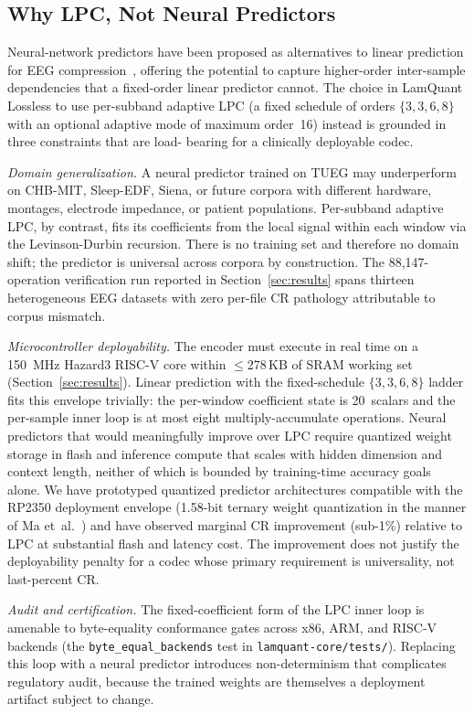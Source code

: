 \documentclass[journal]{IEEEtran}
\begin{document}
\subsection{Why LPC, Not Neural Predictors}
\label{sec:why-lpc}
Neural-network predictors have been proposed as alternatives to
linear prediction for EEG compression~\cite{sriraam2012}, offering
the potential to capture higher-order inter-sample dependencies
that a fixed-order linear predictor cannot. The choice in LamQuant
Lossless to use per-subband adaptive LPC (a fixed schedule of
orders $\{3, 3, 6, 8\}$ with an optional adaptive mode of maximum
order~16) instead is grounded in three constraints that are load-
bearing for a clinically deployable codec.

\emph{Domain generalization.} A neural predictor trained on
TUEG may underperform on CHB-MIT, Sleep-EDF, Siena, or future
corpora with different hardware, montages, electrode impedance,
or patient populations. Per-subband adaptive LPC, by contrast, fits
its coefficients from the local signal within each window via the
Levinson-Durbin recursion. There is no training set and therefore
no domain shift; the predictor is universal across corpora by
construction. The 88{,}147-operation verification run reported in
Section~\ref{sec:results} spans thirteen heterogeneous EEG datasets
with zero per-file CR pathology attributable to corpus mismatch.

\emph{Microcontroller deployability.} The encoder must execute in
real time on a 150~MHz Hazard3 RISC-V core within $\leq$278\,KB
of SRAM working set (Section~\ref{sec:results}). Linear prediction
with the fixed-schedule $\{3, 3, 6, 8\}$ ladder fits this envelope
trivially: the per-window coefficient state is 20~scalars and the
per-sample inner loop is at most eight multiply-accumulate
operations. Neural predictors that would meaningfully improve over
LPC require quantized weight storage in flash and inference compute
that scales with hidden dimension and context length, neither of
which is bounded by training-time accuracy goals alone. We have
prototyped quantized predictor architectures compatible with the
RP2350 deployment envelope (1.58-bit ternary weight quantization
in the manner of Ma et~al.~\cite{ma2024bitnet}) and have observed
marginal CR improvement (sub-1\%) relative to LPC at substantial
flash and latency cost. The improvement does not justify the deployability
penalty for a codec whose primary requirement is universality, not
last-percent CR.

\emph{Audit and certification.} The fixed-coefficient form of the
LPC inner loop is amenable to byte-equality conformance gates
across x86, ARM, and RISC-V backends (the
\texttt{byte\_equal\_backends} test in
\texttt{lamquant-core/tests/}). Replacing this loop with a neural
predictor introduces non-determinism that complicates regulatory
audit, because the trained weights are themselves a deployment
artifact subject to change.
\end{document}

